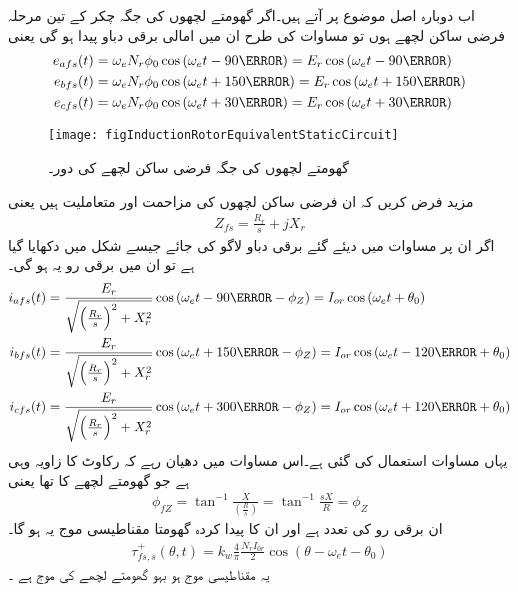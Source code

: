 اب دوبارہ اصل موضوع پر آتے ہیں۔اگر گھومتے لچھوں کی جگہ  چکر کے تین مرحلہ فرضی ساکن لچھے ہوں تو مساوات    کی طرح ان میں امالی برقی دباو پیدا ہو گی یعنی
\begin{gather}
\begin{aligned}\label{مساوات_امالی_تین_دباو}
e_{afs}(t)&=\omega_e N_r \phi_0 \cos \left(\omega_e t -90\degree \right)=E_r \cos \left(\omega_e t -90\degree \right)\\
e_{bfs}(t)&=\omega_e N_r \phi_0 \cos \left(\omega_e t +150\degree \right)=E_r \cos \left(\omega_e t +150\degree \right)\\
e_{cfs}(t)&=\omega_e N_r \phi_0 \cos \left(\omega_e t +30\degree \right)=E_r \cos \left(\omega_e t +30\degree \right)
\end{aligned}
\end{gather}
%
\begin{figure}
\centering
\texttt{[image: figInductionRotorEquivalentStaticCircuit]}
\caption{گھومتے لچھوں کی جگہ فرضی ساکن لچھے کی دور۔}
\label{شکل_امالی_گھومتی_لچھوں_کا_فرضی_مساوی_ساکن_دور}
\end{figure}

مزید فرض کریں کہ ان فرضی ساکن لچھوں کی مزاحمت   اور متعاملیت   ہیں  یعنی
\begin{align}
Z_{fs}=\frac{R_r}{s}+j X_r
\end{align}
اگر ان پر مساوات   میں دیئے گئے برقی دباو لاگو کی جائے جیسے شکل   میں دکھایا گیا ہے تو ان میں برقی رو یہ ہو گی۔
\begin{gather}
\begin{aligned}
i_{afs}(t)&=\frac{E_r}{\sqrt{\left(\frac{R_r}{s} \right)^2+X_r^2}} \cos \left(\omega_e t-90\degree -\phi_Z  \right)=I_{or} \cos \left(\omega_e t+\theta_0 \right)\\
i_{bfs}(t)&=\frac{E_r}{\sqrt{\left(\frac{R_r}{s} \right)^2+X_r^2}} \cos \left(\omega_e t+150\degree -\phi_Z  \right)=I_{or}\cos \left(\omega_e t-120\degree +\theta_0 \right)\\
i_{cfs}(t)&=\frac{E_r}{\sqrt{\left(\frac{R_r}{s} \right)^2+X_r^2}} \cos \left(\omega_e t+300\degree -\phi_Z  \right)=I_{or} \cos \left(\omega_e t+120\degree+\theta_0 \right)
\end{aligned}
\end{gather}
یہاں مساوات   استعمال کی گئی ہے۔اس مساوات میں دھیان رہے کہ رکاوٹ کا زاویہ   وہی ہے جو گھومتے لچھے کا تھا یعنی
\begin{align}
\phi_{fZ}=\tan^{-1} \frac{X}{\left(\frac{R}{s} \right)}=\tan^{-1} \frac{s X}{R}=\phi_Z
\end{align}
ان برقی رو کی تعدد  ہے اور ان کا پیدا کردہ گھومتا مقناطیسی موج یہ ہو گا۔
\begin{align}
\tau_{fs,s}^+(\theta,t)=k_w \frac{4}{\pi}\frac{N_r I_{0r}}{2} \cos (\theta-\omega_e t-\theta_0)
\end{align}
یہ مقناطیسی موج ہو بہو گھومتے لچھے کی موج  ہے ۔

